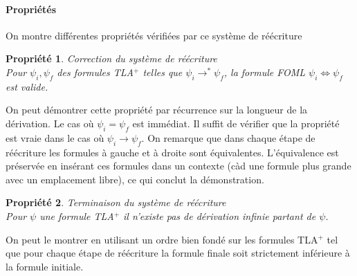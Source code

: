 \documentclass[12pt]{article}
\newtheorem{prop}{Propriété}
\begin{document}
\paragraph{Propriétés}

On montre différentes propriétés vérifiées par ce système de réécriture

\begin{prop} \emph{Correction du système de réécriture} \\
  Pour $\psi_i, \psi_f$ des formules TLA$^+$ telles que $\psi_i \longrightarrow^* \psi_f$,
  la formule FOML $\psi_i \Leftrightarrow \psi_f$ est valide.
\end{prop}

On peut démontrer cette propriété par récurrence sur la longueur de la dérivation.
Le cas où $\psi_i = \psi_f$ est immédiat. Il suffit de vérifier que la propriété est vraie dans le cas où $\psi_i \longrightarrow \psi_f$.
On remarque que dans chaque étape de réécriture les formules à gauche et à droite sont équivalentes.
L'équivalence est préservée en insérant ces formules dans un contexte (càd une formule plus grande avec un emplacement libre), ce qui conclut la démonstration.

\begin{prop} \emph{Terminaison du système de réécriture} \\
  Pour $\psi$ une formule TLA$^+$ il n'existe pas de dérivation infinie partant de $\psi$.
\end{prop}

On peut le montrer en utilisant un ordre bien fondé sur les formules TLA$^+$ tel que pour chaque étape de réécriture la formule finale soit strictement inférieure à la formule initiale.
\end{document}
